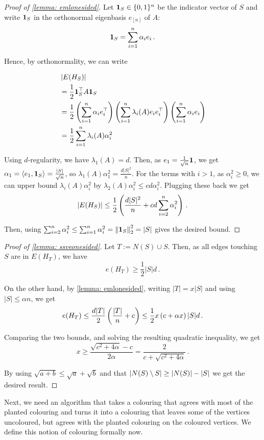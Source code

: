 \begin{proof}[Proof of \cref{lemma: emlonesided}]
    Let $\mathbf{1}_S \in \{0,1\}^n$ be the indicator vector of $S$ and write $\mathbf{1}_S$ in the orthonormal eigenbasis $e_{[n]}$ of $A$:
    $$\mathbf{1}_S = \sum_{i=1}^n \alpha_i e_i\,.$$

    Hence, by orthonormality, we can write

    \begin{align*}
        &\left\lvert E(H_S)\right\rvert\\
        &=\frac{1}{2} \mathbf{1}_S^\top A \mathbf{1}_S\\
        &=\frac{1}{2} \left(\sum_{i=1}^n \alpha_i e_i^\top \right) \left(\sum_{i=1}^n \lambda_i(A) e_i e_i^\top \right) \left(\sum_{i=1}^n \alpha_i e_i\right)\\
        &=\frac{1}{2} \sum_{i=1}^n \lambda_i(A) \alpha_i^2
    \end{align*}

    Using $d$-regularity, we have $\lambda_1(A)=d$.
    Then, as $e_1=\frac{1}{\sqrt{n}}\mathbf{1}$, we get $\alpha_1=\left\langle e_1, \mathbf{1}_S \right\rangle=\frac{|S|}{\sqrt{n}}$, so $\lambda_1(A) \alpha_1^2=\frac{d|S|^2}{n}$.
    For the terms with $i>1$, as $\alpha_i^2\geq 0$, we can upper bound $\lambda_i(A) \alpha_i^2$ by $\lambda_2(A) \alpha_i^2\leq cd\alpha_i^2$.
    Plugging these back we get
    $$\left\lvert E(H_S)\right\rvert\leq \frac{1}{2}\left(\frac{d|S|^2}{n} + cd\sum_{i=2}^n \alpha_i^2\right)\,.$$

    Then, using $\sum_{i=2}^n \alpha_i^2\leq \sum_{i=1}^n \alpha_i^2=\left\lVert\mathbf{1}_S\right\rVert_2^2=|S|$ gives the desired bound.
\end{proof}

\begin{proof}[Proof of \cref{lemma: ssveonesided}]
    Let $T:=N(S)\cup S$.
    Then, as all edges touching $S$ are in $E(H_{T})$, we have
    $$e(H_{T})\geq \frac{1}{2}|S|d\,.$$ 

    On the other hand, by \cref{lemma: emlonesided}, writing $|T|=x|S|$ and using $|S|\leq \alpha n$, we get
    $$e(H_{T})\leq \frac{d|T|}{2}\left(\frac{|T|}{n}+c\right)\leq\frac{1}{2}x\left(c+\alpha x\right)|S|d\,.$$

    Comparing the two bounds, and solving the resulting quadratic inequality, we get 
    $$x\geq \frac{\sqrt{c^2 + 4\alpha}-c}{2\alpha}=\frac{2}{c+\sqrt{c^2+4\alpha}}\,.$$

    By using $\sqrt{a+b}\leq \sqrt{a}+\sqrt{b}$ and that $\left\lvert N(S)\setminus S\right\rvert\geq \left\lvert N(S)\right\rvert-|S|$ we get the desired result.
\end{proof}


Next, we need an algorithm that takes a colouring that agrees with most of the planted colouring and turns it into a colouring that leaves some of the vertices uncoloured, but agrees with the planted colouring on the coloured vertices. We define this notion of colouring formally now.

